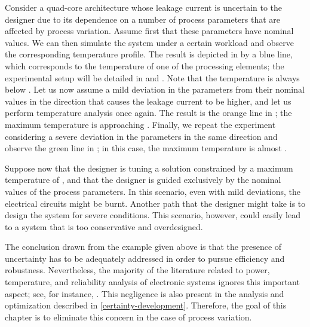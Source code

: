 Consider a quad-core architecture whose leakage current is uncertain to the
designer due to its dependence on a number of process parameters that are
affected by process variation. Assume first that these parameters have nominal
values. We can then simulate the system under a certain workload and observe the
corresponding temperature profile. The result is depicted in
 by a blue line, which corresponds to the temperature of
one of the processing elements; the experimental setup will be detailed in
 and . Note that
the temperature is always below . Let us now assume a mild deviation
in the parameters from their nominal values in the direction that causes the
leakage current to be higher, and let us perform temperature analysis once
again. The result is the orange line in ; the maximum
temperature is approaching . Finally, we repeat the experiment
considering a severe deviation in the parameters in the same direction and
observe the green line in ; in this case, the maximum
temperature is almost .

Suppose now that the designer is tuning a solution constrained by a maximum
temperature of , and that the designer is guided exclusively by the
nominal values of the process parameters. In this scenario, even with mild
deviations, the electrical circuits might be burnt. Another path that the
designer might take is to design the system for severe conditions. This
scenario, however, could easily lead to a system that is too conservative and
overdesigned.

The conclusion drawn from the example given above is that the presence of
uncertainty has to be adequately addressed in order to pursue efficiency and
robustness. Nevertheless, the majority of the literature related to power,
temperature, and reliability analysis of electronic systems ignores this
important aspect; see, for instance, \cite{rao2009, yang2010, rai2011,
thiele2011, pagani2014}. This negligence is also present in the analysis and
optimization described in \cref{certainty-development}. Therefore, the goal of
this chapter is to eliminate this concern in the case of process variation.
